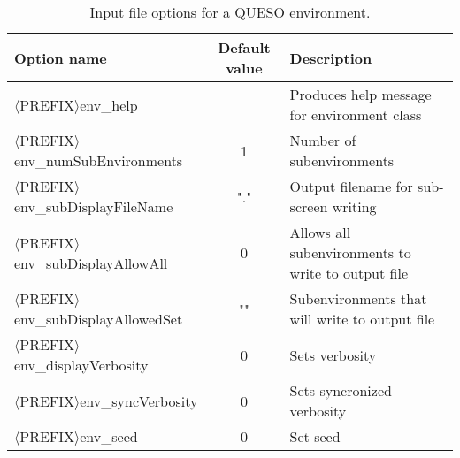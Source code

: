 \begin{table}[htpb]
\begin{center}
\caption{Input file options for a QUESO environment.}\label{tab-env-options}
\begin{tabular}{l c  m{6cm}}
\toprule
Option name                      &  Default  value & Description \\
\midrule\midrule
\ttfamily $\langle$PREFIX$\rangle$env\_help                &     & Produces help message for environment class            \\
\midrule
\ttfamily$\langle$PREFIX$\rangle$env\_numSubEnvironments   &  1  &  Number of subenvironments                \\ %
\midrule
\ttfamily$\langle$PREFIX$\rangle$env\_subDisplayFileName   & \ttfamily"." & Output filename for sub-screen writing     \\ %
\midrule
\ttfamily$\langle$PREFIX$\rangle$env\_subDisplayAllowAll   &  0  & Allows all subenvironments to write to output file \\ %
\midrule
\ttfamily$\langle$PREFIX$\rangle$env\_subDisplayAllowedSet & \ttfamily""  & Subenvironments that will write to output file \\ %
\midrule
\ttfamily$\langle$PREFIX$\rangle$env\_displayVerbosity     &  0  & Sets verbosity				         \\ %
\midrule
\ttfamily$\langle$PREFIX$\rangle$env\_syncVerbosity        &  0  & Sets syncronized verbosity             \\ %
\midrule
\ttfamily$\langle$PREFIX$\rangle$env\_seed                 &  0  & Set seed                              \\ %
%
\bottomrule
\end{tabular}
\end{center}
\end{table}

  

